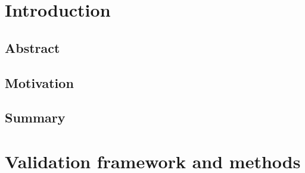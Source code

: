 



\section{Introduction}
\label{sec:valdx-intro}

\subsection{Abstract}
\label{sec:valdx-abstract}

\subsection{Motivation}
\label{sec:valdx-motivation}

\subsection{Summary}
\label{sec:valdx-summary}

\section{Validation framework and methods}
\label{sec:valdx-methods}

